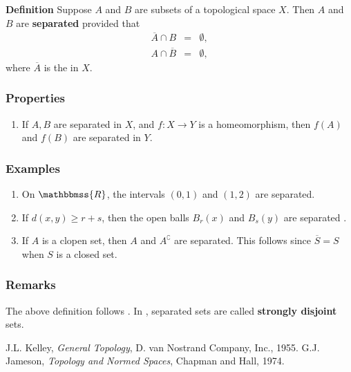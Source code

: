 \documentclass[12pt]{article}
\newcommand{\R}{\mathbbmss{R}}
\begin{document}
{\bf Definition} 
Suppose $A$ and $B$ are subsets of a topological space
$X$. Then $A$ and $B$ are {\bf separated} provided that
\[
\begin{array}{ccc}
\overline{A}\cap B &=& \emptyset, \\
A\cap \overline{B} &=& \emptyset,
\end{array}
\]
where $\overline{A}$ is the  in $X$.

\subsubsection*{Properties}
\begin{enumerate}
\item If $A,B$ are separated in $X$, and $f\colon X\to Y$ is a homeomorphism, 
then $f(A)$ and $f(B)$ are separated in $Y$. 
\end{enumerate}

\subsubsection*{Examples}
\begin{enumerate}
\item On $\R$, the intervals $(0,1)$ and $(1,2)$ are separated.
\item If $d(x,y)\ge r+s$, then the open balls $B_r(x)$ and $B_s(y)$ are 
  separated .
\item If $A$ is a clopen set, then $A$ and $A^\complement$ are separated.
This follows since $\overline{S}=S$ when $S$ is a closed set.
\end{enumerate}

\subsubsection*{Remarks}
The above definition follows \cite{kelley}. In
\cite{jameson}, separated sets are called
{\bf strongly disjoin{t}} sets.

\begin{thebibliography}{9}
J.L. Kelley, \emph{General Topology}, D. van Nostrand Company, Inc., 1955.
 G.J. Jameson, \emph{Topology and Normed Spaces},
Chapman and Hall, 1974.
\end{thebibliography}
\end{document}
